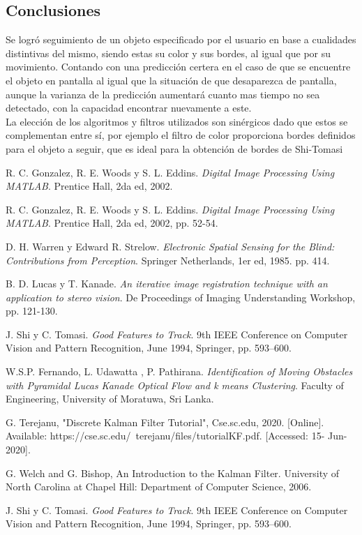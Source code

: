 \subsection{Conclusiones}
Se logró seguimiento de un objeto especificado por el usuario en base a cualidades distintivas del mismo, siendo estas su color y sus bordes, al igual que por su movimiento. Contando con una predicción certera en el caso de que se encuentre el objeto en pantalla al igual que la situación de que desaparezca de pantalla, aunque la varianza de la predicción aumentará cuanto mas tiempo no sea detectado, con la capacidad encontrar nuevamente a este.\\
La elección de los algoritmos y filtros utilizados son sinérgicos dado que estos se complementan entre sí, por ejemplo el filtro de color proporciona bordes definidos para el objeto a seguir, que es ideal para la obtención de bordes de Shi-Tomasi

\begin{thebibliography}{9}

R. C. Gonzalez, R. E. Woods y S. L. Eddins. \textit{Digital Image Processing Using MATLAB}. Prentice Hall, 2da ed, 2002.%

R. C. Gonzalez, R. E. Woods y S. L. Eddins. \textit{Digital Image Processing Using MATLAB}. Prentice Hall, 2da ed, 2002, pp. 52-54.

D. H. Warren y Edward R. Strelow. \textit{Electronic Spatial Sensing for the Blind: Contributions from Perception}. Springer Netherlands, 1er ed, 1985. pp. 414.

B. D. Lucas y T. Kanade. \textit{An iterative image registration technique with an application to stereo vision}. De Proceedings of Imaging Understanding Workshop, pp. 121-130.

J. Shi y C. Tomasi. \textit{Good Features to Track}. 9th IEEE Conference on Computer Vision and Pattern Recognition, June 1994, Springer, pp. 593–600.

W.S.P. Fernando, L. Udawatta , P. Pathirana. \textit{Identification of Moving Obstacles with Pyramidal
Lucas Kanade Optical Flow and k means
Clustering}. Faculty of Engineering, University of Moratuwa, Sri Lanka.

G. Terejanu, "Discrete Kalman Filter Tutorial", Cse.sc.edu, 2020. [Online]. Available: https://cse.sc.edu/~terejanu/files/tutorialKF.pdf. [Accessed: 15- Jun- 2020].

G. Welch and G. Bishop, An Introduction to the Kalman Filter. University of North Carolina at Chapel Hill: Department of Computer Science, 2006.

J. Shi y C. Tomasi. \textit{Good Features to Track}. 9th IEEE Conference on Computer Vision and Pattern Recognition, June 1994, Springer, pp. 593–600.



\end{thebibliography}

